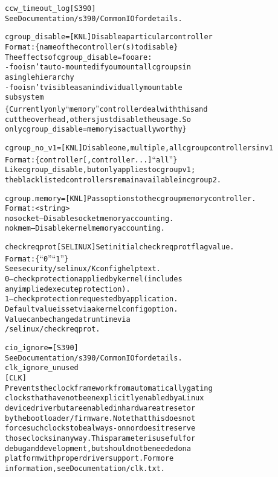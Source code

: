 \documentclass[a4paper,8pt,english]{sphinxmanual}
\begin{document}
\begin{alltt}
        ccw\_timeout\_log {[}S390{]}
                        See Documentation/s390/CommonIO for details.

        cgroup\_disable= {[}KNL{]} Disable a particular controller
                        Format: \{name of the controller(s) to disable\}
                        The effects of cgroup\_disable=foo are:
                        - foo isn't auto-mounted if you mount all cgroups in
                          a single hierarchy
                        - foo isn't visible as an individually mountable
                          subsystem
                        \{Currently only ``memory'' controller deal with this and
                        cut the overhead, others just disable the usage. So
                        only cgroup\_disable=memory is actually worthy\}

        cgroup\_no\_v1=   {[}KNL{]} Disable one, multiple, all cgroup controllers in v1
                        Format: \{ controller{[},controller...{]} \textbar{} ``all'' \}
                        Like cgroup\_disable, but only applies to cgroup v1;
                        the blacklisted controllers remain available in cgroup2.

        cgroup.memory=  {[}KNL{]} Pass options to the cgroup memory controller.
                        Format: \textless{}string\textgreater{}
                        nosocket -- Disable socket memory accounting.
                        nokmem -- Disable kernel memory accounting.

        checkreqprot    {[}SELINUX{]} Set initial checkreqprot flag value.
                        Format: \{ ``0'' \textbar{} ``1'' \}
                        See security/selinux/Kconfig help text.
                        0 -- check protection applied by kernel (includes
                                any implied execute protection).
                        1 -- check protection requested by application.
                        Default value is set via a kernel config option.
                        Value can be changed at runtime via
                                /selinux/checkreqprot.

        cio\_ignore=     {[}S390{]}
                        See Documentation/s390/CommonIO for details.
        clk\_ignore\_unused
                        {[}CLK{]}
                        Prevents the clock framework from automatically gating
                        clocks that have not been explicitly enabled by a Linux
                        device driver but are enabled in hardware at reset or
                        by the bootloader/firmware. Note that this does not
                        force such clocks to be always-on nor does it reserve
                        those clocks in any way. This parameter is useful for
                        debug and development, but should not be needed on a
                        platform with proper driver support.  For more
                        information, see Documentation/clk.txt.


\end{alltt}
\end{document}
